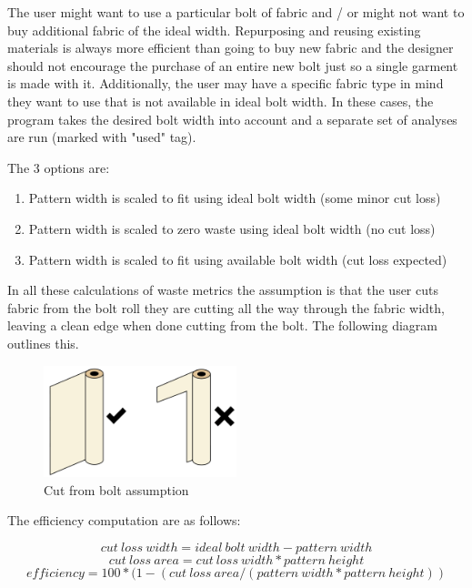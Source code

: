 The user might want to use a particular bolt of fabric and / or might not want to buy additional fabric of the ideal width. Repurposing and reusing existing materials is always more efficient than going to buy new fabric and the designer should not encourage the purchase of an entire new bolt just so a single garment is made with it. Additionally, the user may have a specific fabric type in mind they want to use that is not available in ideal bolt width. In these cases, the program takes the desired bolt width into account and a separate set of analyses are run (marked with "used" tag).

The 3 options are:
\begin{enumerate}
    \item Pattern width is scaled to fit using ideal bolt width (some minor cut loss)
    \item Pattern width is scaled to zero waste using ideal bolt width (no cut loss)
    \item Pattern width is scaled to fit using available bolt width (cut loss expected)
\end{enumerate}

In all these calculations of waste metrics the assumption is that the user cuts fabric from the bolt roll they are cutting all the way through the fabric width, leaving a clean edge when done cutting from the bolt. The following diagram outlines this.

\begin{figure} [htb]
    \centering
    \includegraphics[width = 0.5\textwidth]{Images/bolt cut assumption.png}
    \caption{Cut from bolt assumption}
    \label{fig:cut from bolt}
\end{figure}

The efficiency computation are as follows:

\begin{equation}
    cut\ loss\ width = ideal\ bolt\ width - pattern\ width
    \label{eq:cut loss width}
\end{equation}
\begin{equation}
    cut\ loss\ area = cut\ loss\ width * pattern\ height
    \label{eq:cut loss area}
\end{equation}
\begin{equation}
    efficiency = 100 * (1 - (cut\ loss\ area/ (pattern\ width * pattern\ height))
    \label{eq:cut loss area}
\end{equation}



